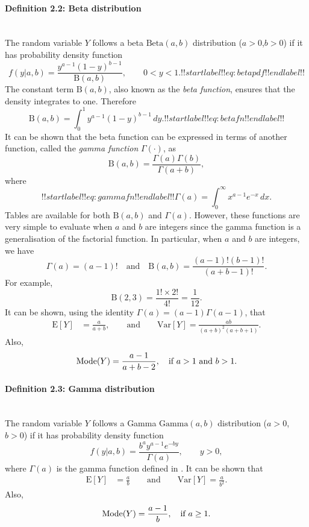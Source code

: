 \paragraph{Definition 2.2: Beta distribution}{~\\
 The random variable $Y$ follows a beta $\mathrm{Beta}(a,b)$ distribution ($a>0$,$b>0$) if it has probability density function
\begin{equation}
f(y|a,b)=\frac{y^{a-1}(1-y)^{b-1}}{\mathrm{B}(a,b)},\quad\quad 0<y<1.
!!startlabel!! eq:betapdf !!endlabel!!
\end{equation}
The constant term $\mathrm{B}(a,b)$, also known as the {\it beta function},
ensures that the density integrates to one. Therefore
\begin{equation}
\mathrm{B}(a,b)=\int_0^1
y^{a-1}(1-y)^{b-1}\,dy.
!!startlabel!! eq:betafn !!endlabel!!
\end{equation}
It can be shown that the beta function can be expressed in terms of another function, called the {\it gamma function} $\Gamma(\cdot)$, as
$$
\mathrm{B}(a,b) =\frac{\Gamma(a)\Gamma(b)}{\Gamma(a+b)},
$$
where
\begin{equation}
!!startlabel!! eq:gammafn !!endlabel!!
\Gamma(a)=\int_0^\infty x^{a-1}e^{-x}\,dx.
\end{equation}
Tables are available for both $\mathrm{B}(a,b)$ and $\Gamma(a)$. However, these functions are very simple to evaluate when $a$ and $b$ are integers since the gamma function is a generalisation of the factorial function. In particular, when $a$ and $b$ are integers, we have
$$
\Gamma(a)=(a-1)!\quad\text{and}\quad 
\mathrm{B}(a,b)=\frac{(a-1)!(b-1)!}{(a+b-1)!}.
$$
For example,
\begin{equation*}
\mathrm{B}(2,3)=\frac{1!\times2!}{4!}=\frac{1}{12}.
\end{equation*}
It can be shown, using the identity $\Gamma(a)=(a-1)\Gamma(a-1)$, that
\begin{align*}
\text{E}[Y]&=\frac{a}{a+b},\quad\quad\text{and}\quad\quad 
\text{Var}[Y]=\frac{ab}{(a+b)^2(a+b+1)}. 
\end{align*}
Also,
$$\textnormal{Mode}(Y)=\frac{a-1}{a+b-2}, \quad\text{if $a>1$ and $b>1$}.$$}
\clearpage
\paragraph{Definition 2.3: Gamma distribution}{~\\
  The random variable $Y$ follows a Gamma $\mathrm{Gamma}(a,b)$ distribution
  ($a>0$, $b>0$) if it has probability density function
$$f(y|a,b) =\frac{b^ay^{a-1}e^{-by}}{\Gamma(a)},\quad\quad y>0,$$ where $\Gamma(a)$ is the gamma function defined in
. It can be shown that
\begin{align*}
\text{E}[Y]&=\frac{a}{b}\quad\quad\text{and}\quad\quad 
\text{Var}[Y]=\frac{a}{b^2}. 
\end{align*}
Also,
$$\textnormal{Mode}(Y)=\frac{a-1}{b}, \quad\text{if $a\geq 1$}.
$$}

